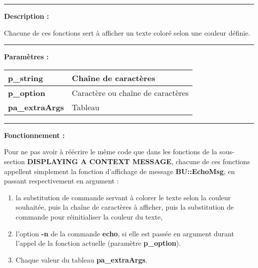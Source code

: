 \documentclass[a4paper,10pt]{article}
\begin{document}

\par\noindent\rule{\textwidth}{0.4pt}

\begin{justify}
    \textbf{Description :}

    Chacune de ces fonctions sert à afficher un texte coloré selon une couleur définie.
\end{justify}


\par\noindent\rule{\textwidth}{0.4pt}

\begin{justify}
    \textbf{Paramètres :}

    \begin{tabular}{|l|l|}
        \hline
        \textbf{\color{vars}p\_string} & Chaîne de caractères\\
        \hline
        \textbf{\color{vars}p\_option} & Caractère ou chaîne de caractères\\
        \hline
        \textbf{\color{vars}pa\_extraArgs} & Tableau\\
        \hline
    \end{tabular}
\end{justify}


\par\noindent\rule{\textwidth}{0.4pt}

\begin{justify}
    \textbf{Fonctionnement :}

    Pour ne pas avoir à réécrire le même code que dans les fonctions de la sous-section \textbf{\color{sec2}DISPLAYING A CONTEXT MESSAGE}, chacune de ces fonctions appellent simplement la fonction d'affichage de message \textbf{\color{func}BU::EchoMsg}, en passant respectivement en argument :
    \begin{enumerate}
        \item la substitution de commande servant à colorer le texte selon la couleur souhaitée, puis la chaîne de caractères à afficher, puis la substitution de commande pour réinitialiser la couleur du texte,
        \item l'option \textbf{\color{cmds}-n} de la commande \textbf{\color{cmds}echo}, si elle est passée en argument durant l'appel de la fonction actuelle (paramètre \textbf{\color{vars}p\_option}).
        \item Chaque valeur du tableau \textbf{\color{vars}pa\_extraArgs}.
    \end{enumerate}    
\end{justify}
\end{document}
